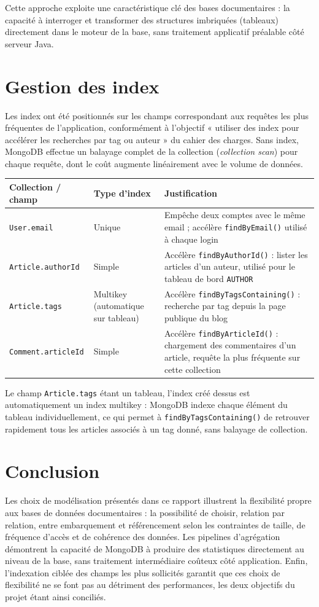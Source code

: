 \documentclass[11pt,a4paper]{article}
\begin{document}
Cette approche exploite une caractéristique clé des bases documentaires : la capacité à interroger et transformer des structures imbriquées (tableaux) directement dans le moteur de la base, sans traitement applicatif préalable côté serveur Java.

\section{Gestion des index}
Les index ont été positionnés sur les champs correspondant aux requêtes les plus fréquentes de l'application, conformément à l'objectif « utiliser des index pour accélérer les recherches par tag ou auteur » du cahier des charges. Sans index, MongoDB effectue un balayage complet de la collection (\emph{collection scan}) pour chaque requête, dont le coût augmente linéairement avec le volume de données.

\begin{longtable}{p{3cm}p{3cm}p{7cm}}
\toprule
\textbf{Collection / champ} & \textbf{Type d'index} & \textbf{Justification} \\
\midrule
\endhead
\texttt{User.email} & Unique & Empêche deux comptes avec le même email ; accélère \texttt{findByEmail()} utilisé à chaque login \\
\texttt{Article.authorId} & Simple & Accélère \texttt{findByAuthorId()} : lister les articles d'un auteur, utilisé pour le tableau de bord \texttt{AUTHOR} \\
\texttt{Article.tags} & Multikey (automatique sur tableau) & Accélère \texttt{findByTagsContaining()} : recherche par tag depuis la page publique du blog \\
\texttt{Comment.articleId} & Simple & Accélère \texttt{findByArticleId()} : chargement des commentaires d'un article, requête la plus fréquente sur cette collection \\
\bottomrule
\end{longtable}

Le champ \texttt{Article.tags} étant un tableau, l'index créé dessus est automatiquement un index multikey : MongoDB indexe chaque élément du tableau individuellement, ce qui permet à \texttt{findByTagsContaining()} de retrouver rapidement tous les articles associés à un tag donné, sans balayage de collection.

\section{Conclusion}
Les choix de modélisation présentés dans ce rapport illustrent la flexibilité propre aux bases de données documentaires : la possibilité de choisir, relation par relation, entre embarquement et référencement selon les contraintes de taille, de fréquence d'accès et de cohérence des données. Les pipelines d'agrégation démontrent la capacité de MongoDB à produire des statistiques directement au niveau de la base, sans traitement intermédiaire coûteux côté application. Enfin, l'indexation ciblée des champs les plus sollicités garantit que ces choix de flexibilité ne se font pas au détriment des performances, les deux objectifs du projet étant ainsi conciliés.
\end{document}
